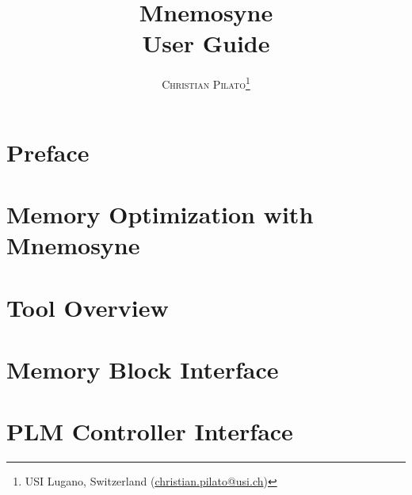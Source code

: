 \documentclass[a4paper,11pt]{book}
\title{
\Huge \textbf{\sc Mnemosyne}\\%
\huge User Guide%
}
\author{\textsc{Christian Pilato}\thanks{USI Lugano, Switzerland (\url{christian.pilato@usi.ch})}}
\begin{document}
	
\frontmatter
\maketitle
	
\tableofcontents
	
\mainmatter
	
\chapter{Preface}


\chapter{Memory Optimization with Mnemosyne}\label{ch:methodology}


\chapter{Tool Overview}\label{ch:tool}


\chapter{Memory Block Interface}\label{ch:mem_interface}


\chapter{PLM Controller Interface}\label{ch:proc_interface}

\end{document}
